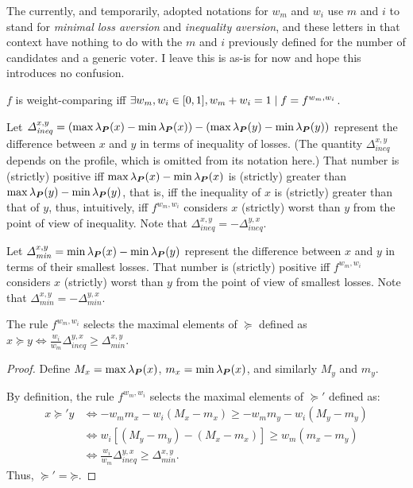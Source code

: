 \documentclass[version=3.21, pagesize, twoside=off, bibliography=totoc, DIV=calc, fontsize=12pt, a4paper]{scrartcl}
\begin{document}
\begin{remark}
	The currently, and temporarily, adopted notations for $w_m$ and $w_i$ use $m$ and $i$ to stand for \emph{minimal loss aversion} and \emph{inequality aversion}, and these letters in that context have nothing to do with the $m$ and $i$ previously defined for the number of candidates and a generic voter. I leave this is as-is for now and hope this introduces no confusion.
\end{remark}

\begin{definition}
	$f$ is weight-comparing iff $\exists w_m, w_i \in [0, 1], w_m + w_i = 1 \suchthat f = f^{w_m, w_i}$.
\end{definition}

Let $\Delta^{x, y}_\mathit{ineq} = (\max \lprof(x) - \min \lprof(x)) - (\max \lprof(y) - \min \lprof(y))$ represent the difference between $x$ and $y$ in terms of inequality of losses. 
(The quantity $\Delta^{x, y}_\mathit{ineq}$ depends on the profile, which is omitted from its notation here.)
That number is (strictly) positive iff $\max \lprof(x) - \min \lprof(x)$ is (strictly) greater than $\max \lprof(y) - \min \lprof(y)$, that is, iff the inequality of $x$ is (strictly) greater than that of $y$, thus, intuitively, iff $f^{w_m, w_i}$ considers $x$ (strictly) worst than $y$ from the point of view of inequality.
Note that $\Delta^{x, y}_\mathit{ineq} = - \Delta^{y, x}_\mathit{ineq}$.

Let $\Delta^{x, y}_\mathit{min} = \min\lprof(x) - \min\lprof(y)$ represent the difference between $x$ and $y$ in terms of their smallest losses. 
That number is (strictly) positive iff $f^{w_m, w_i}$ considers $x$ (strictly) worst than $y$ from the point of view of smallest losses.
Note that $\Delta^{x, y}_\mathit{min} = - \Delta^{y, x}_\mathit{min}$.

\begin{proposition}
	\label{th:wcDelta}
	The rule $f^{w_m, w_i}$ selects the maximal elements of $\succeq$ defined as 
	$x \succeq y ⇔ \frac{w_i}{w_m} \Delta^{y, x}_\mathit{ineq} ≥ \Delta^{x, y}_\mathit{min}$.
\end{proposition}
\begin{proof}
	Define $M_x = \max \lprof(x)$, $m_x = \min \lprof(x)$, and similarly $M_y$ and $m_y$.
	
	By definition, the rule $f^{w_m, w_i}$ selects the maximal elements of $\succeq'$ defined as: 
	\begin{align}
		x \succeq' y & ⇔ -w_m m_x - w_i (M_x - m_x) ≥ -w_m m_y - w_i (M_y - m_y)\\
		& ⇔ w_i [(M_y - m_y) - (M_x - m_x)] ≥ w_m (m_x - m_y)\\
		& ⇔ \frac{w_i}{w_m} \Delta^{y, x}_\mathit{ineq} ≥ \Delta^{x, y}_\mathit{min}.
	\end{align}
	Thus, $\mathbin{\succeq'} = \mathbin{\succeq}$.
\end{proof}
\end{document}
